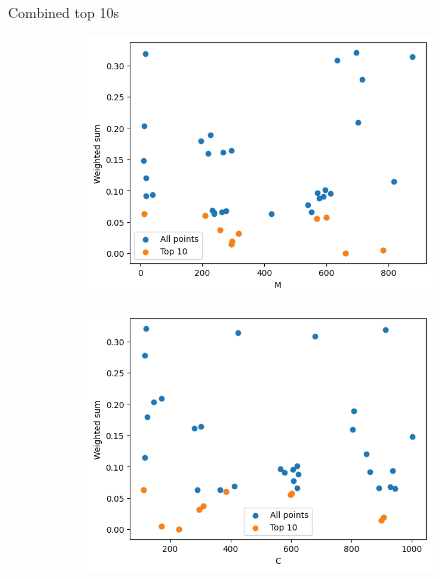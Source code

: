 \begin{frame}
    Combined top 10s
    \begin{figure}
        \centering
        \hfill
        \begin{subfigure}{0.45\textwidth}
            \includegraphics[width=\textwidth]{../images/report/wall-M.png}
        \end{subfigure}
        \hfill
        \begin{subfigure}{0.45\textwidth}
            \includegraphics[width=\textwidth]{../images/report/wall-C.png}
        \end{subfigure}
        \hfill


\end{figure}
\end{frame}
